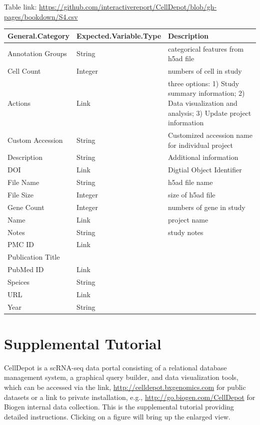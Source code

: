 \documentclass[runningheads]{llncs}
\begin{document}
Table link: \url{https://github.com/interactivereport/CellDepot/blob/gh-pages/bookdown/S4.csv}

\begin{table}
\centering
\begin{tabular}[t]{l|l|l}
\hline
General.Category & Expected.Variable.Type & Description\\
\hline
Annotation Groups & String & categorical  features from h5ad file\\
\hline
Cell Count & Integer & numbers of cell in study\\
\hline
Actions & Link & three options: 1) Study summary information; 2) Data visualization and analysis; 3) Update project information\\
\hline
Custom Accession & String & Customized accession name for individual project\\
\hline
Description & String & Additional information\\
\hline
DOI & Link & Digtial Object Identifier\\
\hline
File Name & String & h5ad file name\\
\hline
File Size & Integer & size of h5ad file\\
\hline
Gene Count & Integer & numbers of gene in study\\
\hline
Name & Link & project name\\
\hline
Notes & String & study notes\\
\hline
PMC ID & Link & \\
\hline
Publication Title &  & \\
\hline
PubMed ID & Link & \\
\hline
Speices & String & \\
\hline
URL & Link & \\
\hline
Year & String & \\
\hline
\end{tabular}
\end{table}

\hypertarget{SITutorial}{%
\chapter{Supplemental Tutorial}\label{SITutorial}}

CellDepot is a scRNA-seq data portal consisting of a relational database management system, a graphical query builder, and data visualization tools, which can be accessed via the link, \url{http://celldepot.bxgenomics.com} for public datasets or a link to private installation, e.g., \url{http://go.biogen.com/CellDepot} for Biogen internal data collection. This is the supplemental tutorial providing detailed instructions. Clicking on a figure will bring up the enlarged view.
\end{document}
